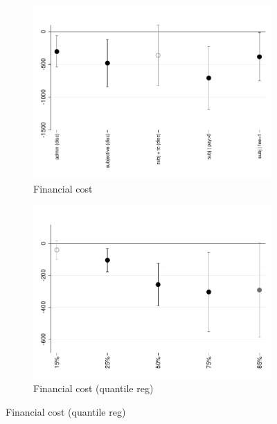 \documentclass[11pt]{article}
\begin{document}
\begin{figure}[H]
\end{figure}






\begin{figure}[H]
    \caption{The effect of the fee-forcing treatment}
    \label{fc_pro2}
    \begin{center}
    \begin{subfigure}{0.45\textwidth}
        \caption{Financial cost}
        \centering
        \includegraphics[width=\textwidth]{Figuras/fc_te_pro_2.pdf}
    \end{subfigure}
        \begin{subfigure}{0.45\textwidth}
        \caption{Financial cost (quantile reg)}
        \centering
        \includegraphics[width=\textwidth]{Figuras/fc_quantile_pro_2.pdf}
    \end{subfigure}
    

\end{center}
\end{figure}
\end{document}
